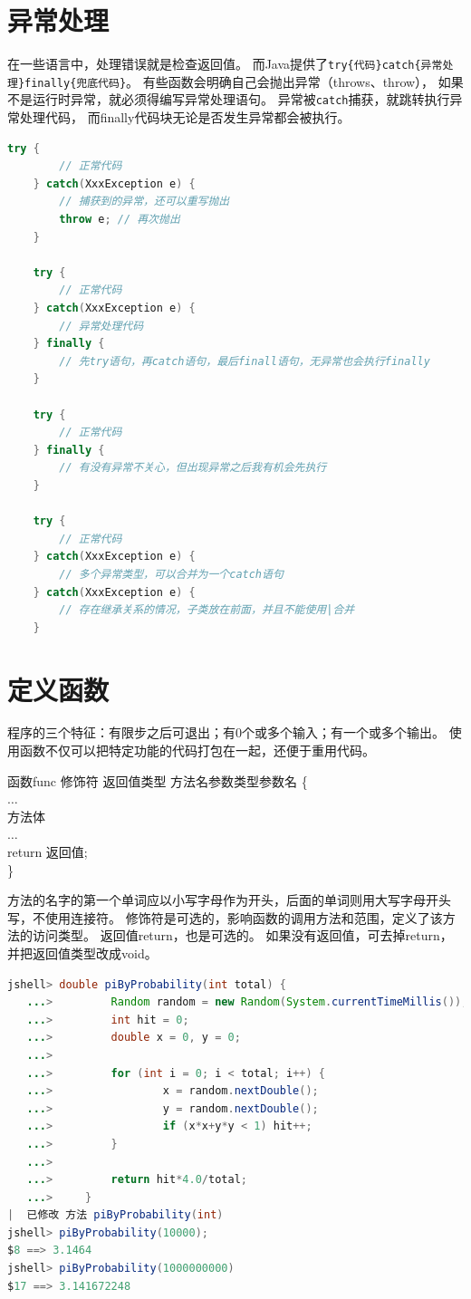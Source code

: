 \section{异常处理}
在一些语言中，处理错误就是检查返回值。
而Java提供了\lstinline!try{代码}catch{异常处理}finally{兜底代码}!。
有些函数会明确自己会抛出异常（throws、throw），
如果不是运行时异常，就必须得编写异常处理语句。
异常被\lstinline{catch}捕获，就跳转执行异常处理代码，
而finally代码块无论是否发生异常都会被执行。
\medskip
\begin{lstlisting}[language=Java]
	try {
		// 正常代码
	} catch(XxxException e) { 
		// 捕获到的异常，还可以重写抛出
		throw e; // 再次抛出
	}
 
	try {
		// 正常代码
	} catch(XxxException e) {
		// 异常处理代码
	} finally { 
		// 先try语句，再catch语句，最后finall语句，无异常也会执行finally
	}
 
	try {
		// 正常代码
	} finally { 
		// 有没有异常不关心，但出现异常之后我有机会先执行
	}
 
	try {
		// 正常代码
	} catch(XxxException e) { 
		// 多个异常类型，可以合并为一个catch语句
	} catch(XxxException e) { 
		// 存在继承关系的情况，子类放在前面，并且不能使用|合并
	}
 \end{lstlisting}

\section{定义函数}
程序的三个特征：有限步之后可退出；有0个或多个输入；有一个或多个输出。
使用函数不仅可以把特定功能的代码打包在一起，还便于重用代码。

\begin{definition}{函数}{func}
	修饰符 \textvisiblespace 返回值类型 \textvisiblespace 方法名\(参数类型 参数名\) \{ \\
  \codeident[1cm] $\dots$ \\
  \codeident[1cm] 方法体 \\
  \codeident[1cm] $\dots$ \\ 
  \codeident[1cm] return 返回值; \\
	\}
\end{definition}

\noindent
方法的名字的第一个单词应以小写字母作为开头，后面的单词则用大写字母开头写，不使用连接符。
修饰符是可选的，影响函数的调用方法和范围，定义了该方法的访问类型。
返回值return，也是可选的。
如果没有返回值，可去掉return，并把返回值类型改成void。
\bigskip
\begin{lstlisting}[language=Java, backgroundcolor=\color{lightgray!10}]
	jshell> double piByProbability(int total) {
   ...>         Random random = new Random(System.currentTimeMillis());
   ...>         int hit = 0;
   ...>         double x = 0, y = 0;
   ...> 
   ...>         for (int i = 0; i < total; i++) {
   ...>                 x = random.nextDouble();
   ...>                 y = random.nextDouble();
   ...>                 if (x*x+y*y < 1) hit++;
   ...>         }
   ...> 
   ...>         return hit*4.0/total;
   ...>     }
|  已修改 方法 piByProbability(int)
jshell> piByProbability(10000);
$8 ==> 3.1464
jshell> piByProbability(1000000000)
$17 ==> 3.141672248
\end{lstlisting}

